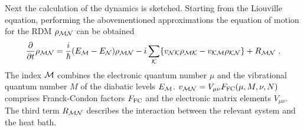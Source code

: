 \documentclass[12pt,twoside,a4paper]{report}
\begin{document}
Next the calculation of the dynamics is sketched.
Starting from the Liouville equation, performing 
the abovementioned approximations
the equation of motion for the
RDM $\rho_{\cal{M} \cal{N}}$ can be obtained \cite{may92,kueh94}
\begin{equation}
  \label{RDM-el-vib}
  \frac
     {\partial}
     {\partial t} 
  \rho
  _{\cal{M} 
    \cal{N}}
                 =
                      \frac
                         {i}
                         {\hbar}
                     (
                        E_{\cal{M}}
                       -E_{\cal{N}}
                     ) 
                     \rho_{\cal{M} \cal{N}} 
                 -   i 
                     \sum_{\cal{K}} 
                         \{ 
                             v_{\cal{N} \cal{K}} 
                             \rho_{\cal{M} \cal{K}} 
                          -  v_{\cal{K} \cal{M}} 
                             \rho_{\cal{K} \cal{N}} 
                          \} 
                  +  R_{\cal{M} \cal{N}}~.
\end{equation}
The index $\cal{M}$ combines the electronic quantum number $\mu$ and the
vibrational quantum number ${M}$ of the diabatic levels $E_{\cal{M}}$.
$v_{\cal{M} \cal{N}}=V_{\mu \nu} F_{\rm FC}(\mu,{M},\nu,{N})$ 
comprises Franck-Condon
factors $F_{\rm FC}$ and the electronic matrix elements $V_{\mu \nu}$.  
The third term $R_{\cal{M} \cal{N}}$
describes the interaction between the relevant system and the
heat bath.
\end{document}
